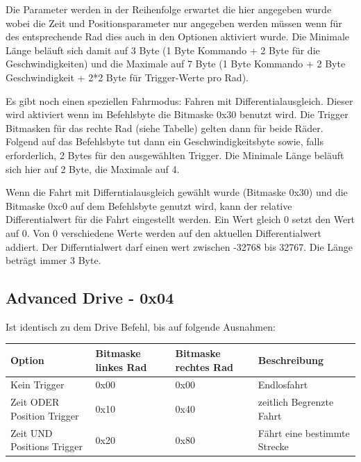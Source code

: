 \documentclass[a4paper]{article}
\begin{document}
	Die Parameter werden in der Reihenfolge erwartet die hier angegeben wurde wobei die Zeit und Positionsparameter nur
	angegeben werden müssen wenn für des entsprechende Rad dies auch in den Optionen aktiviert wurde.
	Die Minimale Länge beläuft sich damit auf 3 Byte (1 Byte Kommando + 2 Byte für die Geschwindigkeiten) und die
	Maximale auf 7 Byte (1 Byte Kommando + 2 Byte Geschwindigkeit + 2*2 Byte für Trigger-Werte pro Rad).

	Es gibt noch einen speziellen Fahrmodus: Fahren mit Differentialausgleich. Dieser wird aktiviert wenn im Befehlsbyte
	die Bitmaske 0x30 benutzt wird. Die Trigger Bitmasken für das rechte Rad (siehe Tabelle) gelten dann für beide Räder.
	Folgend auf das Befehlsbyte tut dann ein Geschwindigkeitsbyte sowie, falls erforderlich, 2 Bytes für den ausgewählten
	Trigger. Die Minimale Länge beläuft sich hier auf 2 Byte, die Maximale auf 4.

	Wenn die Fahrt mit Differntialausgleich gewählt wurde (Bitmaske 0x30) und die Bitmaske 0xc0 auf dem Befehlsbyte
	genutzt wird, kann der relative Differentialwert für die Fahrt eingestellt werden. Ein Wert gleich 0 setzt den Wert auf
	0. Von 0 verschiedene Werte werden auf den aktuellen Differentialwert addiert. Der Differntialwert darf einen wert zwischen
	-32768 bis 32767. Die Länge beträgt immer 3 Byte.

	\subsection{Advanced Drive - 0x04}

	Ist identisch zu dem Drive Befehl, bis auf folgende Ausnahmen:
	
	\begin{tabularx}{\linewidth}{|l|l|l|X|}
		\hline
		\textbf{Option} & \textbf{Bitmaske linkes Rad} & \textbf{Bitmaske rechtes Rad} & \textbf{Beschreibung} \\
		\hline
		\hline
		Kein Trigger				& 0x00						   & 0x00						   & Endlosfahrt \\
		\hline
		Zeit ODER Position Trigger	& 0x10						   & 0x40						   & zeitlich Begrenzte Fahrt\\
		\hline
		Zeit UND Positions Trigger  & 0x20						   & 0x80						   & Fährt eine bestimmte Strecke \\
		\hline
	\end{tabularx}
\end{document}
